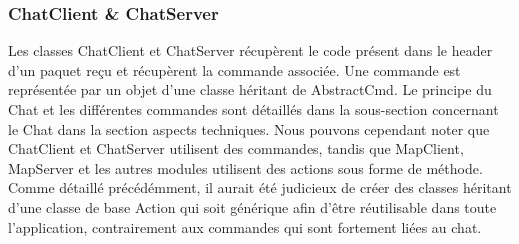 \subsubsection{ChatClient \& ChatServer}
Les classes ChatClient et ChatServer récupèrent le code présent dans le header d'un paquet reçu et récupèrent la commande associée. Une commande est représentée par un objet d'une classe héritant de AbstractCmd. Le principe du Chat et les différentes commandes sont détaillés dans la sous-section concernant le Chat dans la section aspects techniques. Nous pouvons cependant noter que ChatClient et ChatServer utilisent des commandes, tandis que MapClient, MapServer et les autres modules utilisent des actions sous forme de méthode. Comme détaillé précédémment, il aurait été judicieux de créer des classes héritant d'une classe de base Action qui soit générique afin d'être réutilisable dans toute l'application, contrairement aux commandes qui sont fortement liées au chat.
